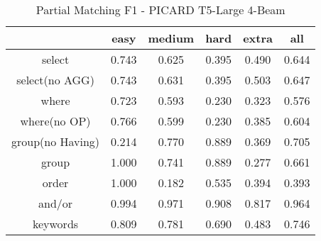 \begin{table}[h]
    \centering
    \begin{tabular}{|c|c|c|c|c|c|}
        \hline
                         & easy  & medium & hard  & extra & all   \\ \hline
        select           & 0.743 & 0.625  & 0.395 & 0.490 & 0.644 \\ \hline
        select(no AGG)   & 0.743 & 0.631  & 0.395 & 0.503 & 0.647 \\ \hline
        where            & 0.723 & 0.593  & 0.230 & 0.323 & 0.576 \\ \hline
        where(no OP)     & 0.766 & 0.599  & 0.230 & 0.385 & 0.604 \\ \hline
        group(no Having) & 0.214 & 0.770  & 0.889 & 0.369 & 0.705 \\ \hline
        group            & 1.000 & 0.741  & 0.889 & 0.277 & 0.661 \\ \hline
        order            & 1.000 & 0.182  & 0.535 & 0.394 & 0.393 \\ \hline
        and/or           & 0.994 & 0.971  & 0.908 & 0.817 & 0.964 \\ \hline
        keywords         & 0.809 & 0.781  & 0.690 & 0.483 & 0.746 \\ \hline
    \end{tabular}
    \caption{Partial Matching F1 - PICARD T5-Large 4-Beam}
\end{table}